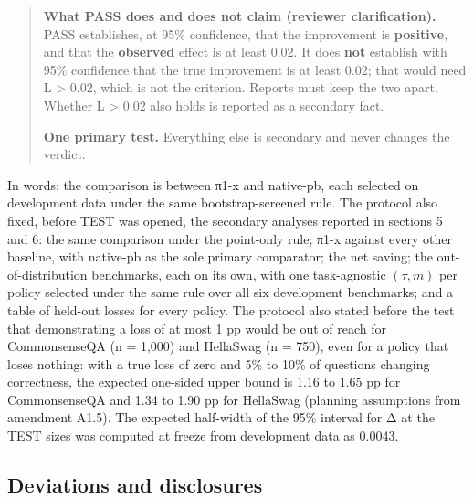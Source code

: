 \begin{quote}
\textbf{What PASS does and does not claim (reviewer clarification).} PASS establishes, at 95\% confidence, that the improvement is \textbf{positive}, and that the \textbf{observed} effect is at least 0.02. It does \textbf{not} establish with 95\% confidence that the true improvement is at least 0.02; that would need L \textgreater{} 0.02, which is not the criterion. Reports must keep the two apart. Whether L \textgreater{} 0.02 also holds is reported as a secondary fact.

\textbf{One primary test.} Everything else is secondary and never changes the verdict.
\end{quote}

In words: the comparison is between π1-x and native-pb, each selected on development data under the same bootstrap-screened rule. The protocol also fixed, before TEST was opened, the secondary analyses reported in sections 5 and 6: the same comparison under the point-only rule; π1-x against every other baseline, with native-pb as the sole primary comparator; the net saving; the out-of-distribution benchmarks, each on its own, with one task-agnostic \((\tau, m)\) per policy selected under the same rule over all six development benchmarks; and a table of held-out losses for every policy. The protocol also stated before the test that demonstrating a loss of at most 1 pp would be out of reach for CommonsenseQA (n = 1,000) and HellaSwag (n = 750), even for a policy that loses nothing: with a true loss of zero and 5\% to 10\% of questions changing correctness, the expected one-sided upper bound is 1.16 to 1.65 pp for CommonsenseQA and 1.34 to 1.90 pp for HellaSwag (planning assumptions from amendment A1.5). The expected half-width of the 95\% interval for Δ at the TEST sizes was computed at freeze from development data as 0.0043.

\subsection{Deviations and disclosures}

